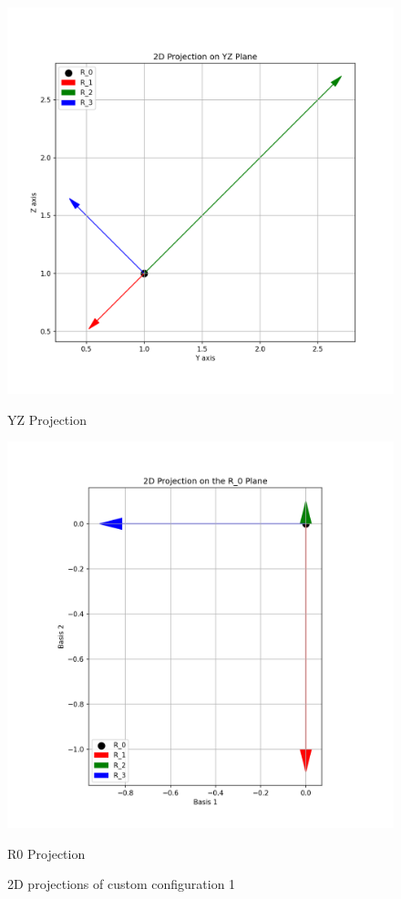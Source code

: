 \begin{figure}[H]
    \begin{minipage}{0.48\textwidth}
        \centering
        \includegraphics[width=\textwidth]{figures/custom1_yz.png}
        \caption*{YZ Projection}
    \end{minipage}\hfill
    \begin{minipage}{0.48\textwidth}
        \centering
        \includegraphics[width=\textwidth]{figures/custom1_r0.png}
        \caption*{R0 Projection}
    \end{minipage}
    \caption{2D projections of custom configuration 1}
    \label{fig:example_custom1_2d}
\end{figure}

